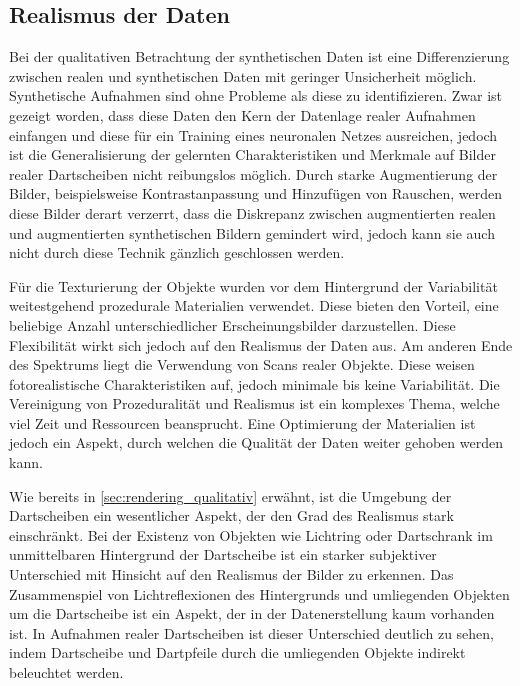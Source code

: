 
\vspace*{-0.2cm}
\subsection{Realismus der Daten}

Bei der qualitativen Betrachtung der synthetischen Daten ist eine Differenzierung zwischen realen und synthetischen Daten mit geringer Unsicherheit möglich. Synthetische Aufnahmen sind ohne Probleme als diese zu identifizieren. Zwar ist gezeigt worden, dass diese Daten den Kern der Datenlage realer Aufnahmen einfangen und diese für ein Training eines neuronalen Netzes ausreichen, jedoch ist die Generalisierung der gelernten Charakteristiken und Merkmale auf Bilder realer Dartscheiben nicht reibungslos möglich. Durch starke Augmentierung der Bilder, beispielsweise Kontrastanpassung und Hinzufügen von Rauschen, werden diese Bilder derart verzerrt, dass die Diskrepanz zwischen augmentierten realen und augmentierten synthetischen Bildern gemindert wird, jedoch kann sie auch nicht durch diese Technik gänzlich geschlossen werden.

Für die Texturierung der Objekte wurden vor dem Hintergrund der Variabilität weitestgehend prozedurale Materialien verwendet. Diese bieten den Vorteil, eine beliebige Anzahl unterschiedlicher Erscheinungsbilder darzustellen. Diese Flexibilität wirkt sich jedoch auf den Realismus der Daten aus. Am anderen Ende des Spektrums liegt die Verwendung von Scans realer Objekte. Diese weisen fotorealistische Charakteristiken auf, jedoch minimale bis keine Variabilität. Die Vereinigung von Prozeduralität und Realismus ist ein komplexes Thema, welche viel Zeit und Ressourcen beansprucht. Eine Optimierung der Materialien ist jedoch ein Aspekt, durch welchen die Qualität der Daten weiter gehoben werden kann.

Wie bereits in \autoref{sec:rendering_qualitativ} erwähnt, ist die Umgebung der Dartscheiben ein wesentlicher Aspekt, der den Grad des Realismus stark einschränkt. Bei der Existenz von Objekten wie Lichtring oder Dartschrank im unmittelbaren Hintergrund der Dartscheibe ist ein starker subjektiver Unterschied mit Hinsicht auf den Realismus der Bilder zu erkennen. Das Zusammenspiel von Lichtreflexionen des Hintergrunds und umliegenden Objekten um die Dartscheibe ist ein Aspekt, der in der Datenerstellung kaum vorhanden ist. In Aufnahmen realer Dartscheiben ist dieser Unterschied deutlich zu sehen, indem Dartscheibe und Dartpfeile durch die umliegenden Objekte indirekt beleuchtet werden.

